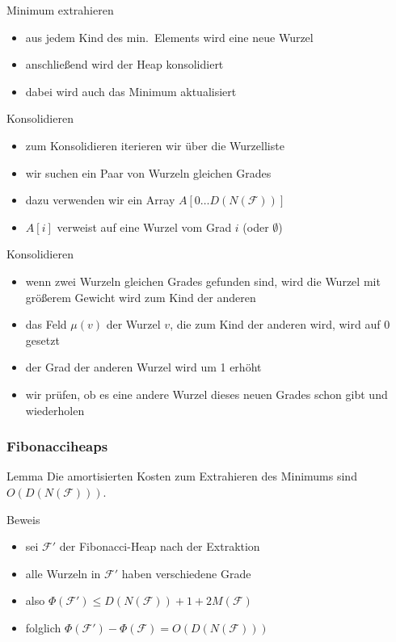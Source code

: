 \documentclass[aspectratio=1610, 11pt]{beamer}
\newcommand\cF{\mathcal F}
\newcommand{\mytitle}{Fibonacciheaps}
\begin{document}
\begin{frame}
\begin{overprint}
\begin{exampleblock}{Minimum extrahieren}
\begin{itemize}
			\item aus jedem Kind des min.\ Elements wird eine neue Wurzel
			\item anschlie\ss end wird der Heap \alert{konsolidiert}
			\item dabei wird auch das Minimum aktualisiert
		\end{itemize}
	\end{exampleblock}	
\begin{exampleblock}{Konsolidieren}
		\begin{itemize}
			\item zum Konsolidieren iterieren wir \"uber die Wurzelliste
			\item wir suchen ein Paar von Wurzeln gleichen Grades
			\item dazu verwenden wir ein Array $A[0\ldots D(N(\cF))]$
			\item $A[i]$ verweist auf eine Wurzel vom Grad $i$ (oder $\emptyset$)
		\end{itemize}
	\end{exampleblock}	
\begin{exampleblock}{Konsolidieren}
		\begin{itemize}
			\item wenn zwei Wurzeln gleichen Grades gefunden sind, wird die Wurzel mit gr\"o\ss erem Gewicht wird zum Kind der anderen 
			\item das Feld $\mu(v)$ der Wurzel $v$, die zum Kind der anderen wird, wird auf $0$ gesetzt
			\item der Grad der anderen Wurzel wird um 1 erh\"oht
			\item wir pr\"ufen, ob es eine andere Wurzel dieses neuen Grades schon gibt und wiederholen
		\end{itemize}
	\end{exampleblock}	
	\end{overprint}
\end{frame}

\begin{frame}\frametitle{\mytitle}
\begin{block}{Lemma}
	Die amortisierten Kosten zum Extrahieren des Minimums sind $O(D(N(\cF)))$.
	\end{block}	
\begin{exampleblock}{Beweis}
	\begin{itemize}
		\item sei $\cF'$ der Fibonacci-Heap nach der Extraktion
		\item alle Wurzeln in $\cF'$ haben verschiedene Grade
		\item also $\Phi(\cF')\leq D(N(\cF))+1+2M(\cF)$
		\item folglich $\Phi(\cF')-\Phi(\cF)=O(D(N(\cF)))$
	\end{itemize}
	\end{exampleblock}	
\end{frame}
\end{document}
